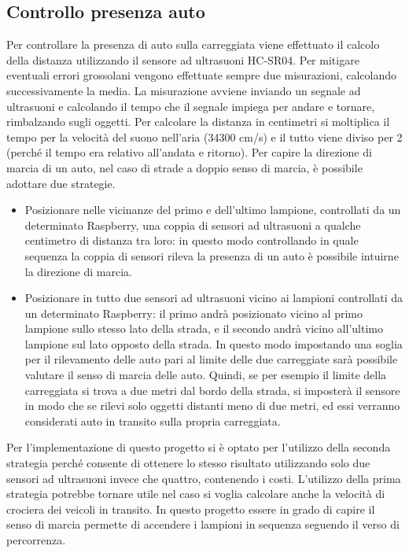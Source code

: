 \subsection{Controllo presenza auto \label{cpa}}
Per controllare la presenza di auto sulla carreggiata viene effettuato il calcolo della distanza utilizzando il sensore ad ultrasuoni HC-SR04.
Per mitigare eventuali errori grossolani vengono effettuate sempre due misurazioni, calcolando successivamente la media.
La misurazione avviene inviando un segnale ad ultrasuoni e calcolando il tempo che il segnale impiega per andare e tornare, rimbalzando sugli oggetti.
Per calcolare la distanza in centimetri si moltiplica il tempo per la velocità del suono nell'aria (34300 cm/s) e il tutto viene diviso per 2 (perché il tempo era relativo all'andata e ritorno).
Per capire la direzione di marcia di un auto, nel caso di strade a doppio senso di marcia, è possibile adottare due strategie.
\begin{itemize}
 \item Posizionare nelle vicinanze del primo e dell'ultimo lampione, controllati da un determinato Raspberry, una coppia di sensori ad ultrasuoni a qualche centimetro di distanza tra loro: in questo modo controllando in quale sequenza la coppia di sensori rileva la presenza di un auto è possibile intuirne la direzione di marcia.
 \item Posizionare in tutto due sensori ad ultrasuoni vicino ai lampioni controllati da un determinato Raspberry: il primo andrà posizionato vicino al primo lampione sullo stesso lato della strada, e il secondo andrà vicino all'ultimo lampione sul lato opposto della strada.
 In questo modo impostando una soglia per il rilevamento delle auto pari al limite delle due carreggiate sarà possibile valutare il senso di marcia delle auto.
 Quindi, se per esempio il limite della carreggiata si trova a due metri dal bordo della strada, si imposterà il sensore in modo che se rilevi solo oggetti distanti meno di due metri, ed essi verranno considerati auto in transito sulla propria carreggiata.
\end{itemize}
Per l'implementazione di questo progetto si è optato per l'utilizzo della seconda strategia perché consente di ottenere lo stesso risultato utilizzando solo due sensori ad ultrasuoni invece che quattro, contenendo i costi.
L'utilizzo della prima strategia potrebbe tornare utile nel caso si voglia calcolare anche la velocità di crociera dei veicoli in transito.
In questo progetto essere in grado di capire il senso di marcia permette di accendere i lampioni in sequenza seguendo il verso di percorrenza.
